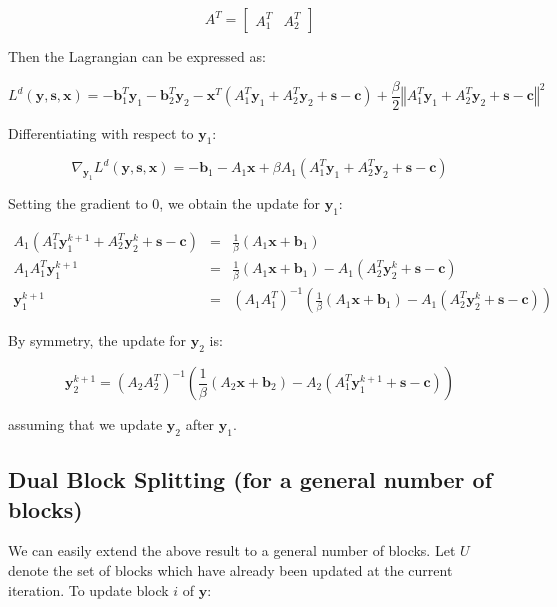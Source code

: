 \documentclass{article}
\begin{document}
\[
A^{T}=\begin{bmatrix}A_{1}^{T} & A_{2}^{T}\end{bmatrix}
\]


Then the Lagrangian can be expressed as:

\[
L^{d}(\mathbf{y},\mathbf{s},\mathbf{x})=-\mathbf{b}_{1}^{T}\mathbf{y}_{1}-\mathbf{b}_{2}^{T}\mathbf{y}_{2}-\mathbf{x}^{T}\left(A_{1}^{T}\mathbf{y}_{1}+A_{2}^{T}\mathbf{y}_{2}+\mathbf{s}-\mathbf{c}\right)+\frac{\beta}{2}\left\Vert A_{1}^{T}\mathbf{y}_{1}+A_{2}^{T}\mathbf{y}_{2}+\mathbf{s}-\mathbf{c}\right\Vert ^{2}
\]


Differentiating with respect to $\mathbf{y}_{1}$:

\[
\nabla_{\mathbf{y}_{1}}L^{d}(\mathbf{y},\mathbf{s},\mathbf{x})=-\mathbf{b}_{1}-A_{1}\mathbf{x}+\beta A_{1}\left(A_{1}^{T}\mathbf{y}_{1}+A_{2}^{T}\mathbf{y}_{2}+\mathbf{s}-\mathbf{c}\right)
\]


Setting the gradient to 0, we obtain the update for $\mathbf{y}_{1}$:

\begin{eqnarray*}
A_{1}\left(A_{1}^{T}\mathbf{y}_{1}^{k+1}+A_{2}^{T}\mathbf{y}_{2}^{k}+\mathbf{s}-\mathbf{c}\right) & = & \frac{1}{\beta}\left(A_{1}\mathbf{x}+\mathbf{b}_{1}\right)\\
A_{1}A_{1}^{T}\mathbf{y}_{1}^{k+1} & = & \frac{1}{\beta}\left(A_{1}\mathbf{x}+\mathbf{b}_{1}\right)-A_{1}\left(A_{2}^{T}\mathbf{y}_{2}^{k}+\mathbf{s}-\mathbf{c}\right)\\
\mathbf{y}_{1}^{k+1} & = & \left(A_{1}A_{1}^{T}\right)^{-1}\left(\frac{1}{\beta}\left(A_{1}\mathbf{x}+\mathbf{b}_{1}\right)-A_{1}\left(A_{2}^{T}\mathbf{y}_{2}^{k}+\mathbf{s}-\mathbf{c}\right)\right)
\end{eqnarray*}


By symmetry, the update for $\mathbf{y}_{2}$ is:

\[
\mathbf{y}_{2}^{k+1}=\left(A_{2}A_{2}^{T}\right)^{-1}\left(\frac{1}{\beta}\left(A_{2}\mathbf{x}+\mathbf{b}_{2}\right)-A_{2}\left(A_{1}^{T}\mathbf{y}_{1}^{k+1}+\mathbf{s}-\mathbf{c}\right)\right)
\]


assuming that we update $\mathbf{y}_{2}$ after $\mathbf{y}_{1}$.


\subsection*{Dual Block Splitting (for a general number of blocks)}

We can easily extend the above result to a general number of blocks.
Let $U$ denote the set of blocks which have already been updated
at the current iteration. To update block $i$ of $\mathbf{y}$:
\end{document}
